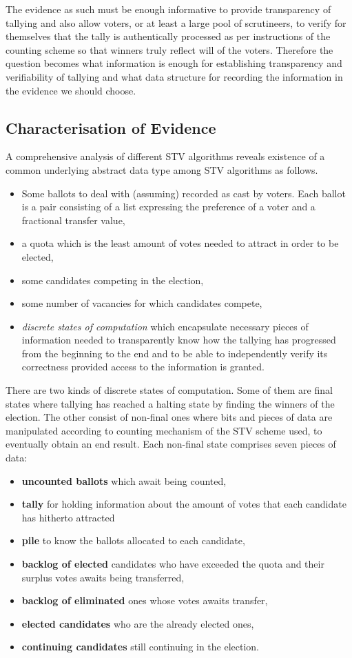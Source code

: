 \documentclass[10pt,conference]{IEEEtran}
\begin{document}
  
The evidence as such must be enough informative to provide transparency of tallying and also allow  voters, or at least a large pool of scrutineers, to verify for themselves that the tally is authentically processed as per instructions of the counting scheme  so that winners truly reflect will of the voters. Therefore the question becomes what information is enough  for establishing transparency and verifiability of tallying  and what data structure for recording the information in the evidence we should choose.
\subsection{Characterisation of Evidence} 
A comprehensive analysis of different STV algorithms reveals existence of a common underlying abstract data type among STV algorithms as follows. 
\begin{itemize}
\item Some ballots to deal with (assuming) recorded as cast by voters. Each ballot is a pair consisting of a list expressing the preference of a voter and a fractional transfer value,
\item a quota which is the least amount of votes needed to attract in order to be elected, 
\item some candidates competing in the election, 
\item some number of vacancies for which candidates compete,
\item \emph{discrete states of computation} which encapsulate necessary  pieces of information needed to transparently know how the tallying has progressed from the beginning to the end and to be able to independently verify its correctness provided access to the information is granted. 
\end{itemize}
There are two kinds of discrete states of computation. Some of them are final states where tallying has reached a halting state by finding the winners of the election. The other consist of non-final ones where bits and pieces of data are manipulated according to counting mechanism of the STV scheme used, to eventually obtain an end result. Each non-final state comprises seven pieces of data: 
\begin{itemize}
 \item\textbf{uncounted ballots} which await being counted,
 \item\textbf{tally} for holding information about the amount of votes that each candidate has hitherto attracted %
 \item\textbf{pile} to know the ballots allocated to each candidate, 
 \item\textbf{backlog of elected} candidates who have exceeded the quota and their surplus votes awaits being transferred,
 \item\textbf{backlog of eliminated} ones whose votes awaits transfer,
 \item\textbf{elected candidates} who are the already elected ones,%
 \item\textbf{continuing candidates} still continuing in the election. 
 \end{itemize}
\end{document}
